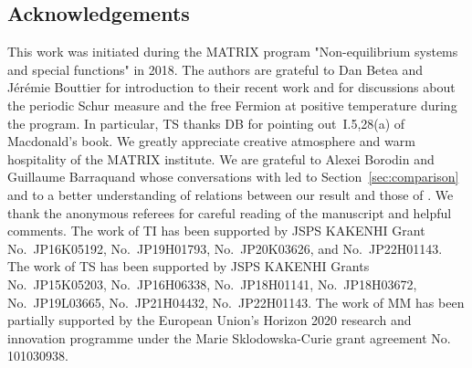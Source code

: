 \documentclass[pdftex]{sigma}
\numberwithin{equation}{section}
\begin{document}
\subsection*{Acknowledgements}
 This work was initiated
 during the MATRIX program "Non-equilibrium systems and special functions" in 2018. The authors are grateful to Dan Betea and J{\'e}r{\'e}mie Bouttier for
 introduction to their recent work \cite{BeteaBouttier2019PeriodicSchur}
 and for
 discussions about the periodic Schur measure and the free Fermion at positive
 temperature during the program.
 In particular, TS thanks DB for pointing out~I.5,28(a) of Macdonald's book. We greatly appreciate creative atmosphere and warm hospitality of the MATRIX institute. We are grateful to Alexei Borodin and Guillaume Barraquand whose conversations with led to Section~\ref{sec:comparison} and to a better understanding of relations between our result and those of \cite{Borodin2018momentmatch}.
 We thank the anonymous referees for careful reading of the manuscript and helpful comments.
 The work of TI has been supported by JSPS KAKENHI Grant No.\ JP16K05192, No.\ JP19H01793, No.\ JP20K03626, and No.\ JP22H01143.
 The work of TS has been supported by JSPS KAKENHI Grants No.\ JP15K05203, No.\ JP16H06338, No.\ JP18H01141, No.\ JP18H03672, No.\ JP19L03665, No.\ JP21H04432, No.\ JP22H01143.
 The work of MM has been partially supported by the European Union’s Horizon 2020 research and innovation programme under the Marie Sklodowska-Curie grant agreement No. 101030938.
\end{document}
